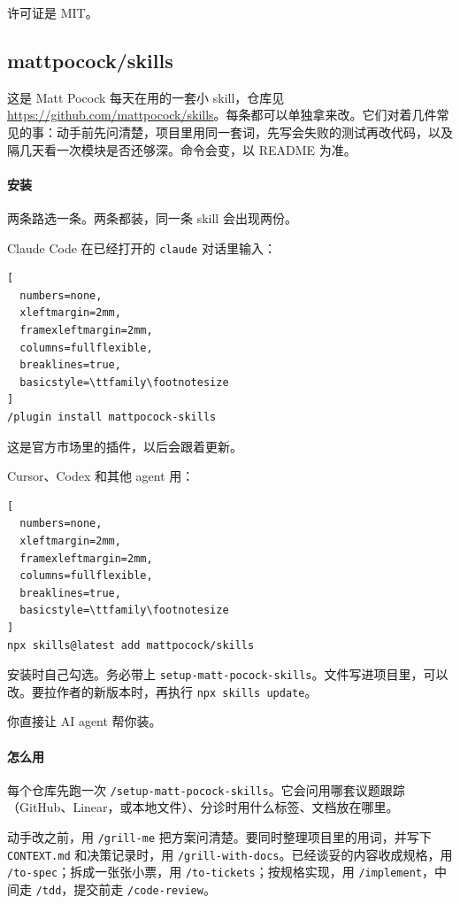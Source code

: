 许可证是 MIT。




\subsection{mattpocock/skills}
这是 Matt Pocock 每天在用的一套小 skill，仓库见 \url{https://github.com/mattpocock/skills}。每条都可以单独拿来改。它们对着几件常见的事：动手前先问清楚，项目里用同一套词，先写会失败的测试再改代码，以及隔几天看一次模块是否还够深。命令会变，以 README 为准。

\paragraph{安装}
两条路选一条。两条都装，同一条 skill 会出现两份。

Claude Code 在已经打开的 \verb|claude| 对话里输入：
\begin{lstlisting}[
  numbers=none,
  xleftmargin=2mm,
  framexleftmargin=2mm,
  columns=fullflexible,
  breaklines=true,
  basicstyle=\ttfamily\footnotesize
]
/plugin install mattpocock-skills
\end{lstlisting}
这是官方市场里的插件，以后会跟着更新。

Cursor、Codex 和其他 agent 用：
\begin{lstlisting}[
  numbers=none,
  xleftmargin=2mm,
  framexleftmargin=2mm,
  columns=fullflexible,
  breaklines=true,
  basicstyle=\ttfamily\footnotesize
]
npx skills@latest add mattpocock/skills
\end{lstlisting}
安装时自己勾选。务必带上 \verb|setup-matt-pocock-skills|。文件写进项目里，可以改。要拉作者的新版本时，再执行 \verb|npx skills update|。

\begin{xiaonao}
你直接让 AI agent 帮你装。
\end{xiaonao}

\paragraph{怎么用}
每个仓库先跑一次 \verb|/setup-matt-pocock-skills|。它会问用哪套议题跟踪（GitHub、Linear，或本地文件）、分诊时用什么标签、文档放在哪里。

动手改之前，用 \verb|/grill-me| 把方案问清楚。要同时整理项目里的用词，并写下 \verb|CONTEXT.md| 和决策记录时，用 \verb|/grill-with-docs|。已经谈妥的内容收成规格，用 \verb|/to-spec|；拆成一张张小票，用 \verb|/to-tickets|；按规格实现，用 \verb|/implement|，中间走 \verb|/tdd|，提交前走 \verb|/code-review|。

